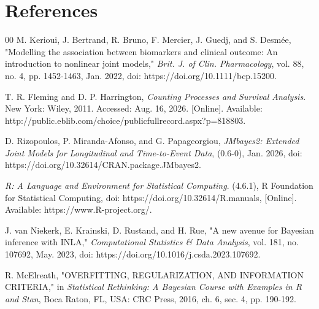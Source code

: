 \documentclass[11pt,
compress,
]{beamer}
\begin{document}
\section{References}

\begin{frame}
\begin{thebibliography}{00}
  M. Kerioui, J. Bertrand, R. Bruno, F. Mercier, J. Guedj, and S. Desm\'ee, "Modelling the association between biomarkers and clinical outcome: An introduction to nonlinear joint models," \emph{Brit. J. of Clin. Pharmacology}, vol. 88, no. 4, pp. 1452-1463, Jan. 2022, doi: https://doi.org/10.1111/bcp.15200.

 T. R. Fleming and D. P. Harrington, \emph{Counting Processes and Survival Analysis}. New York: Wiley, 2011. Accessed: Aug. 16, 2026. [Online]. Available: http://public.eblib.com/choice/publicfullrecord.aspx?p=818803.

 D. Rizopoulos, P. Miranda-Afonso, and G. Papageorgiou, \emph{JMbayes2: Extended Joint Models for Longitudinal and Time-to-Event Data}, (0.6-0), Jan. 2026, doi: https://doi.org/10.32614/CRAN.package.JMbayes2.

  \emph{R: A Language and Environment for Statistical Computing}. (4.6.1), R Foundation for Statistical Computing, doi: https://doi.org/10.32614/R.manuals, [Online]. Available: https://www.R-project.org/.

 J. van Niekerk, E. Krainski, D. Rustand, and H. Rue, "A new avenue for Bayesian inference with INLA," \emph{Computational Statistics \& Data Analysis}, vol. 181, no. 107692,  May. 2023, doi: https://doi.org/10.1016/j.csda.2023.107692.

 R. McElreath, "OVERFITTING, REGULARIZATION, AND INFORMATION CRITERIA," in \emph{Statistical Rethinking: A Bayesian Course with Examples in R and Stan}, Boca Raton, FL, USA: CRC Press, 2016, ch. 6, sec. 4, pp. 190-192.
\end{thebibliography}
\end{frame}
		
\end{document}

